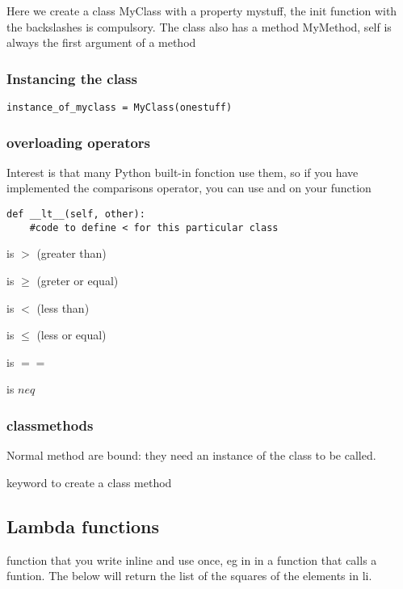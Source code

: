 			Here we create a class MyClass with a property mystuff, the  init function with the backslashes is compulsory.
			The class also has a method MyMethod, self is always the first argument of a method

		\subsubsection{Instancing the class}

\begin{lstlisting}
instance_of_myclass = MyClass(onestuff)
\end{lstlisting}


		\subsubsection{overloading operators}

			Interest is that many Python built-in fonction use them, so if you have implemented the comparisons operator, you can use  and  on your function

\begin{lstlisting}
def __lt__(self, other):
	#code to define < for this particular class
\end{lstlisting}

			 is $>$ (greater than)

			 is $\geq$ (greter or equal)

			 is $<$ (less than)

			 is $\leq$ (less or equal)

			 is $==$

			 is $neq$ 

		\subsubsection{classmethods}

			Normal method are bound: they need an instance of the class to be called.

			 keyword to create a class method


	\subsection{Lambda functions}

		function that you write inline and use once, eg in in a function that calls a funtion. The below will return the list of the squares of the elements in li.


